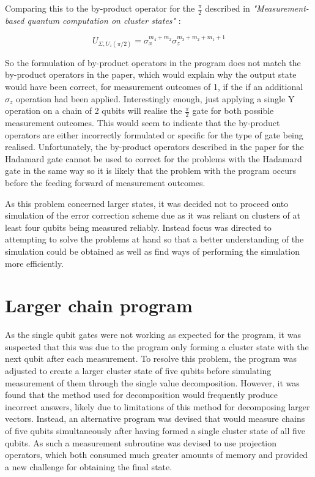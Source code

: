 Comparing this to the by-product operator for the $\frac{\pi}{2}$ described in \textit{"Measurement-based quantum computation on cluster states"} \citep{raussendorf_measurement-based_2003}:

\begin{equation}
U_{\Sigma, U_{z} (\pi / 2)} = \sigma_{x}^{m_{4} + m_{2}} \sigma_{z}^{m_{3} + m_{2} + m_{1} + 1} 
\end{equation}

So the formulation of by-product operators in the program does not match the by-product operators in the paper, which would explain why the output state would have been correct, for measurement outcomes of 1, if the if an additional $\sigma_{z}$ operation had been applied. Interestingly enough, just applying a single Y operation on a chain of 2 qubits will realise the $\frac{\pi}{2}$ gate for both possible measurement outcomes. This would seem to indicate that the by-product operators are either incorrectly formulated or specific for the type of gate being realised.  Unfortunately, the by-product operators described in the paper for the Hadamard gate cannot be used to correct for the problems with the Hadamard gate in the same way so it is likely that the problem with the program occurs before the feeding forward of measurement outcomes.


As this problem concerned larger states, it was decided not to proceed onto simulation of the error correction scheme due as it was reliant on clusters of at least four qubits being measured reliably. Instead focus was directed to attempting to solve the problems at hand so that a better understanding of the simulation could be obtained as well as find ways of performing the simulation more efficiently. 


\section{Larger chain program}
\label{sec:larger_chain}

As the single qubit gates were not working as expected for the program, it was suspected that this was due to the program only forming a cluster state with the next qubit after each measurement. To resolve this problem, the program was adjusted to create a larger cluster state of five qubits before simulating measurement of them through the single value decomposition. However, it was found that the method used for decomposition would frequently produce incorrect answers, likely due to limitations of this method for decomposing larger vectors. Instead, an alternative program was devised that would measure chains of five qubits simultaneously after having formed a single cluster state of all five qubits. As such a measurement subroutine was devised to use projection operators, which both consumed much greater amounts of memory and provided a new challenge for obtaining the final state.

